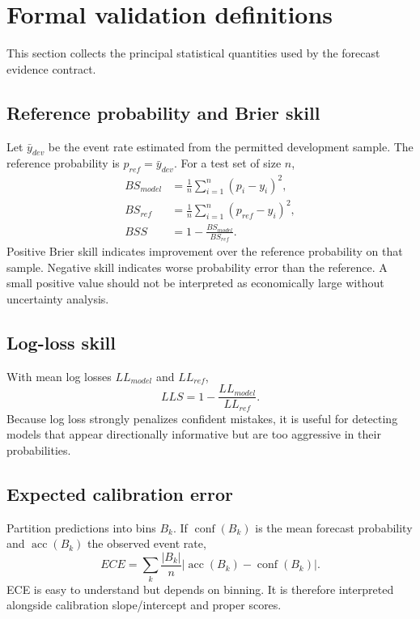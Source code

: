 \documentclass[11pt]{article}
\begin{document}
\section{Formal validation definitions}
This section collects the principal statistical quantities used by the forecast evidence contract.

\subsection{Reference probability and Brier skill}
Let $\bar y_{dev}$ be the event rate estimated from the permitted development sample. The reference probability is $p_{ref}=\bar y_{dev}$. For a test set of size $n$,
\begin{align}
BS_{model} &= \frac{1}{n}\sum_{i=1}^n(p_i-y_i)^2,\\
BS_{ref} &= \frac{1}{n}\sum_{i=1}^n(p_{ref}-y_i)^2,\\
BSS &= 1-\frac{BS_{model}}{BS_{ref}}.
\end{align}
Positive Brier skill indicates improvement over the reference probability on that sample. Negative skill indicates worse probability error than the reference. A small positive value should not be interpreted as economically large without uncertainty analysis.

\subsection{Log-loss skill}
With mean log losses $LL_{model}$ and $LL_{ref}$,
\begin{equation}
LLS=1-\frac{LL_{model}}{LL_{ref}}.
\end{equation}
Because log loss strongly penalizes confident mistakes, it is useful for detecting models that appear directionally informative but are too aggressive in their probabilities.

\subsection{Expected calibration error}
Partition predictions into bins $B_k$. If $\operatorname{conf}(B_k)$ is the mean forecast probability and $\operatorname{acc}(B_k)$ the observed event rate,
\begin{equation}
ECE=\sum_k\frac{|B_k|}{n}\left|\operatorname{acc}(B_k)-\operatorname{conf}(B_k)\right|.
\end{equation}
ECE is easy to understand but depends on binning. It is therefore interpreted alongside calibration slope/intercept and proper scores.
\end{document}

